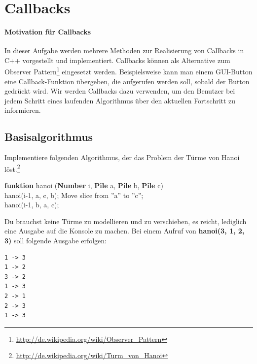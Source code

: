\section{Callbacks}


\paragraph*{Motivation für Callbacks}
In dieser Aufgabe werden mehrere Methoden zur Realisierung von Callbacks in C++ vorgestellt und implementiert.
Callbacks können als Alternative zum Observer Pattern\footnote{\url{http://de.wikipedia.org/wiki/Observer_Pattern}} eingesetzt werden.
Beispielsweise kann man einem GUI-Button eine Callback-Funktion übergeben, die aufgerufen werden soll, sobald der Button gedrückt wird.
Wir werden Callbacks dazu verwenden, um den Benutzer bei jedem Schritt eines laufenden Algorithmus über den aktuellen Fortschritt zu informieren.

\subsection{Basisalgorithmus}
Implementiere folgenden Algorithmus, der das Problem der Türme von Hanoi löst.\footnote{\url{http://de.wikipedia.org/wiki/Turm_von_Hanoi}}
\begin{algorithm}[H]
 \SetAlgoLined
 \textbf{funktion} hanoi (\textbf{Number} i, \textbf{Pile} a, \textbf{Pile} b, \textbf{Pile} c) { \\
      {
        hanoi(i-1, a, c, b); 
        Move slice from ''a'' to ''c''; \\
        hanoi(i-1, b, a, c); 
     }
 }
\end{algorithm}

Du brauchst keine Türme zu modellieren und zu verschieben, es reicht, lediglich eine Ausgabe auf die Konsole zu machen. Bei einem Aufruf von \textbf{hanoi(3, 1, 2, 3)} soll folgende Ausgabe erfolgen:
\begin{lstlisting}
1 -> 3
1 -> 2
3 -> 2
1 -> 3
2 -> 1
2 -> 3
1 -> 3
\end{lstlisting}

